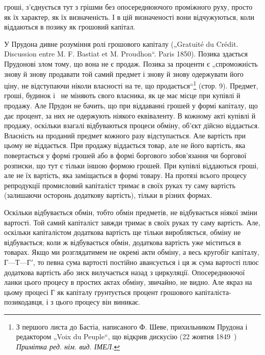 \parcont{}  %
гроші, з’єднується тут з грішми без опосереднюючого проміжного
руху, просто як їх характер, як їх визначеність. І в цій
визначеності вони відчужуються, коли віддаються в позику як
грошовий капітал.

У Прудона дивне розуміння ролі грошового капіталу („Gratuité
du Crédit. Discussion entre M. F. Bastiat et M. Proudhon“.
Paris 1850). Позика здається Прудонові злом тому, що вона не
є продаж. Позика за проценти є „спроможність знову й знову продавати
той самий предмет і знову й знову одержувати його ціну,
не відступаючи ніколи власності на те, що продається“\footnote*{
З першого листа до Бастіа, написаного Ф. Шеве, прихильником Прудона
і редактором „Voix du Peuple“, що відкрив дискусію (22 жовтня 1849~) \emph{Примітка
ред. нім. вид. ІМЕЛ.}
} (стор. 9).
Предмет, гроші, будинок і~ не міняють свого власника, як
це має місце при купівлі й продажу. Але Прудон не бачить,
що при віддаванні грошей у формі капіталу, що дає процент, за
них не одержують ніякого еквіваленту. В кожному акті купівлі
й продажу, оскільки взагалі відбуваються процеси обміну, об’єкт
дійсно віддається. Власність на проданий предмет кожного разу
відступається. Але вартість при цьому не віддається. При продажу
віддається товар, але не його вартість, яка повертається
у формі грошей або в формі боргового зобов’язання чи боргової
розписки, що тут є тільки іншою формою грошей. При купівлі віддаються
гроші, але не їх вартість, яка заміщається в формі товару.
На протязі всього процесу репродукції промисловий капіталіст
тримає в своїх руках ту саму вартість (залишаючи
осторонь додаткову вартість), тільки в різних формах.

Оскільки відбувається обмін, тобто обмін предметів, не відбувається
ніякої зміни вартості. Той самий капіталіст завжди
тримає в своїх руках ту саму вартість. Але, оскільки капіталістом
додаткова вартість ще тільки виробляється, обміну не відбувається;
коли ж відбувається обмін, додаткова вартість уже
міститься в товарах. Якщо ми розглядатимем не окремі акти
обміну, а весь кругобіг капіталу, $Г — Т — Г'$, то певна сума вартості
постійно авансується і ця ж сума вартості плюс додаткова вартість
або зиск вилучається назад з циркуляції. Опосереднюючої
ланки цього процесу в простих актах обміну, звичайно, не видно.
Але якраз на цьому процесі $Г$ як капіталу грунтується процент
грошового капіталіста-позикодавця, і з цього процесу він
виникає.

